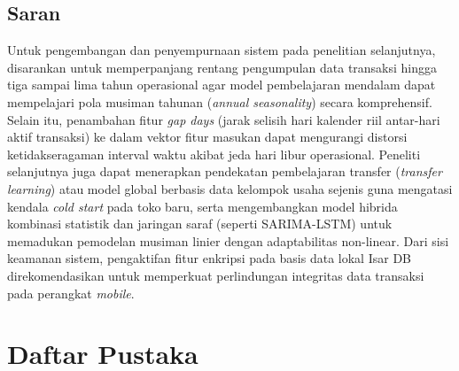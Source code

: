 \documentclass[10pt,a4paper]{article}
\begin{document}
\subsection{Saran}
Untuk pengembangan dan penyempurnaan sistem pada penelitian selanjutnya, disarankan untuk memperpanjang rentang pengumpulan data transaksi hingga tiga sampai lima tahun operasional agar model pembelajaran mendalam dapat mempelajari pola musiman tahunan (\textit{annual seasonality}) secara komprehensif. Selain itu, penambahan fitur \textit{gap days} (jarak selisih hari kalender riil antar-hari aktif transaksi) ke dalam vektor fitur masukan dapat mengurangi distorsi ketidakseragaman interval waktu akibat jeda hari libur operasional. Peneliti selanjutnya juga dapat menerapkan pendekatan pembelajaran transfer (\textit{transfer learning}) atau model global berbasis data kelompok usaha sejenis guna mengatasi kendala \textit{cold start} pada toko baru, serta mengembangkan model hibrida kombinasi statistik dan jaringan saraf (seperti SARIMA-LSTM) untuk memadukan pemodelan musiman linier dengan adaptabilitas non-linear. Dari sisi keamanan sistem, pengaktifan fitur enkripsi pada basis data lokal Isar DB direkomendasikan untuk memperkuat perlindungan integritas data transaksi pada perangkat \textit{mobile}.

\section*{Daftar Pustaka}
\end{document}
